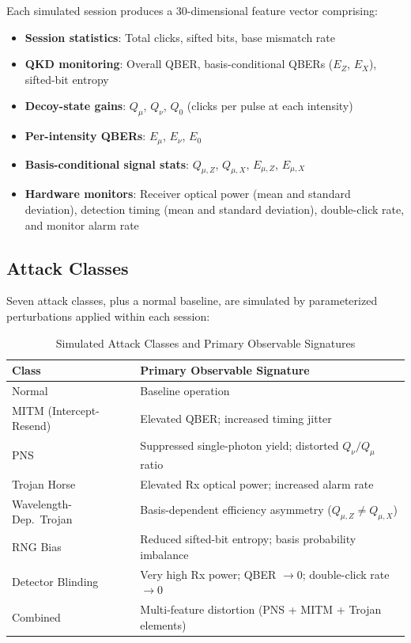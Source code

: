 \documentclass[conference]{IEEEtran}
\begin{document}
Each simulated session produces a 30-dimensional feature vector comprising:

\begin{itemize}
    \item \textbf{Session statistics}: Total clicks, sifted bits, base mismatch rate
    \item \textbf{QKD monitoring}: Overall QBER, basis-conditional QBERs ($E_Z$, $E_X$), sifted-bit entropy
    \item \textbf{Decoy-state gains}: $Q_\mu$, $Q_\nu$, $Q_0$ (clicks per pulse at each intensity)
    \item \textbf{Per-intensity QBERs}: $E_\mu$, $E_\nu$, $E_0$
    \item \textbf{Basis-conditional signal stats}: $Q_{\mu,Z}$, $Q_{\mu,X}$, $E_{\mu,Z}$, $E_{\mu,X}$
    \item \textbf{Hardware monitors}: Receiver optical power (mean and standard deviation), detection timing (mean and standard deviation), double-click rate, and monitor alarm rate
\end{itemize}

\subsection{Attack Classes}

Seven attack classes, plus a normal baseline, are simulated by parameterized perturbations applied within each session:

\begin{table}[htbp]
\centering
\caption{Simulated Attack Classes and Primary Observable Signatures}
\label{tab:attacks}
\begin{tabular}{@{}lp{5cm}@{}}
\toprule
\textbf{Class} & \textbf{Primary Observable Signature} \\
\midrule
Normal & Baseline operation \\
MITM (Intercept-Resend) & Elevated QBER; increased timing jitter \\
PNS & Suppressed single-photon yield; distorted $Q_\nu / Q_\mu$ ratio \\
Trojan Horse & Elevated Rx optical power; increased alarm rate \\
Wavelength-Dep.\ Trojan & Basis-dependent efficiency asymmetry ($Q_{\mu,Z} \neq Q_{\mu,X}$) \\
RNG Bias & Reduced sifted-bit entropy; basis probability imbalance \\
Detector Blinding & Very high Rx power; QBER $\to 0$; double-click rate $\to 0$ \\
Combined & Multi-feature distortion (PNS + MITM + Trojan elements) \\
\bottomrule
\end{tabular}
\end{table}
\end{document}
